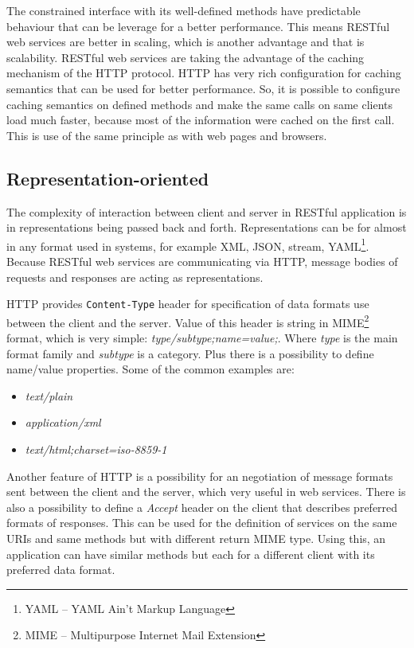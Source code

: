 \documentclass[12pt,final,oneside]{fithesis2}
\begin{document}
The constrained interface with its well-defined methods have predictable behaviour that can be leverage for a better performance. This means RESTful web services are better in scaling, which is another advantage and that is scalability. RESTful web services are taking the advantage of the caching mechanism of the HTTP protocol. HTTP has very rich configuration for caching semantics that can be used for better performance. So, it is possible to configure caching semantics on defined methods and make the same calls on same clients load much faster, because most of the information were cached on the first call. This is use of the same principle as with web pages and browsers. 

\subsection*{Representation-oriented}
The complexity of interaction between client and server in RESTful application is in representations being passed back and forth. Representations can be for almost in any format used in systems, for example XML, JSON, stream, YAML\footnote{YAML -- YAML Ain't Markup Language}. Because RESTful web services are communicating via HTTP, message bodies of requests and responses are acting as representations.

HTTP provides \texttt{Content-Type} header for specification of data formats use between the client and the server. Value of this header is string in MIME\footnote{MIME -- Multipurpose Internet Mail Extension} format, which is very simple: \textit{type/subtype;name=value;}. Where \textit{type} is the main format family and \textit{subtype} is a category. Plus there is a possibility to define name/value properties. Some of the common examples are:

\begin{itemize}
\item
\textit{text/plain}

\item
\textit{application/xml}

\item
\textit{text/html;charset=iso-8859-1}
\end{itemize}

Another feature of HTTP is a possibility for an negotiation of message formats sent between the client and the server, which very useful in web services. There is also a possibility to define a \textit{Accept} header on the client that describes preferred formats of responses. This can be used for the definition of services on the same URIs and same methods but with different return MIME type. Using this, an application can have similar methods but each for a different client with its preferred data format.
\end{document}
